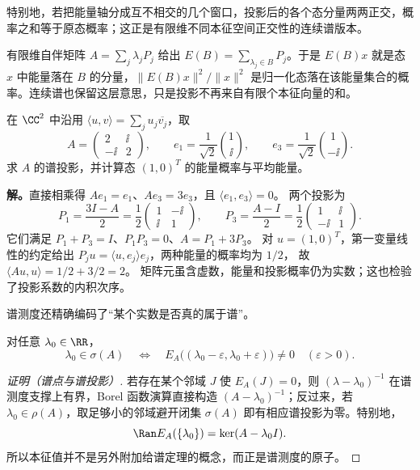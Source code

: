 特别地，若把能量轴分成互不相交的几个窗口，投影后的各个态分量两两正交，概率之和等于原态概率；这正是有限维不同本征空间正交性的连续谱版本。

有限维自伴矩阵 \(A=\sum_j\lambda_jP_j\) 给出 \(E(B)=\sum_{\lambda_j\in B}P_j\)。于是 \(E(B)x\) 就是态 \(x\) 中能量落在 \(B\) 的分量，\(\|E(B)x\|^2/\|x\|^2\) 是归一化态落在该能量集合的概率。连续谱也保留这层意思，只是投影不再来自有限个本征向量的和。

\begin{workedexample}[含复数矩阵元的谱投影]
在 $\CC^2$ 中沿用 $\langle u,v\rangle=\sum_j u_j\overline{v_j}$，取
\[
A=\begin{pmatrix}2&\ii\\-\ii&2\end{pmatrix},\qquad
e_1=\frac1{\sqrt2}\binom1\ii,\qquad
e_3=\frac1{\sqrt2}\binom1{-\ii}.
\]
求 $A$ 的谱投影，并计算态 $(1,0)^T$ 的能量概率与平均能量。

\textbf{解。}直接相乘得 $Ae_1=e_1$、$Ae_3=3e_3$，且 $\langle e_1,e_3\rangle=0$。
两个投影为
\[
P_1=\frac{3I-A}{2}=\frac12\begin{pmatrix}1&-\ii\\\ii&1\end{pmatrix},
\qquad
P_3=\frac{A-I}{2}=\frac12\begin{pmatrix}1&\ii\\-\ii&1\end{pmatrix}.
\]
它们满足 $P_1+P_3=I$、$P_1P_3=0$、$A=P_1+3P_3$。
对 $u=(1,0)^T$，第一变量线性的约定给出
$P_ju=\langle u,e_j\rangle e_j$，两种能量的概率均为 $1/2$，
故 $\langle Au,u\rangle=1/2+3/2=2$。
矩阵元虽含虚数，能量和投影概率仍为实数；这也检验了投影系数的内积次序。
\end{workedexample}

谱测度还精确编码了“某个实数是否真的属于谱”。

\begin{proposition}[谱测度的支撑与原子]
对任意 $\lambda_0\in\RR$，
\begin{equation*}\lambda_0\in\sigma(A)
 \quad\Longleftrightarrow\quad
 E_A\bigl((\lambda_0-\varepsilon,\lambda_0+\varepsilon)\bigr)\neq0
 \quad(\varepsilon>0).
\end{equation*}
\end{proposition}

\begin{proof}[证明（谱点与谱投影）]
若存在某个邻域 $J$ 使 $E_A(J)=0$，则 $(\lambda-\lambda_0)^{-1}$ 在谱测度支撑上有界，Borel 函数演算直接构造 $(A-\lambda_0)^{-1}$；反过来，若 $\lambda_0\in\rho(A)$，取足够小的邻域避开闭集 $\sigma(A)$ 即有相应谱投影为零。特别地，
\begin{equation*}\Ran E_A(\{\lambda_0\})=\ker(A-\lambda_0I).
\end{equation*}
所以本征值并不是另外附加给谱定理的概念，而正是谱测度的原子。
\end{proof}

